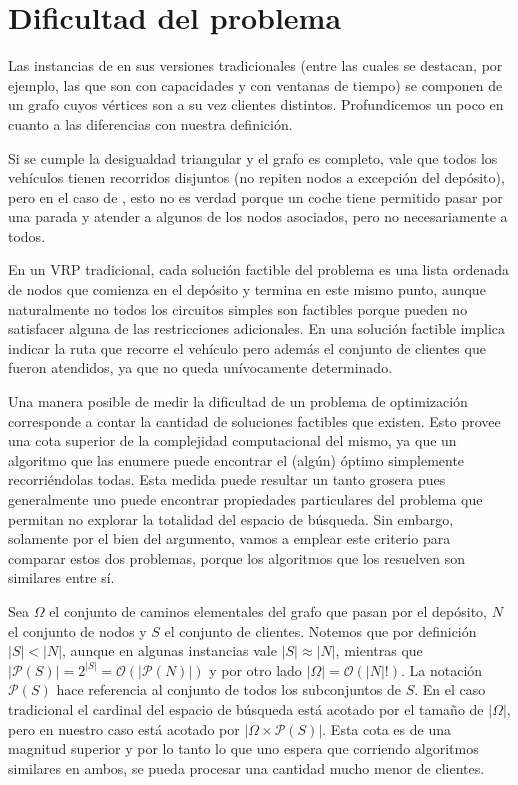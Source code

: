 \section{Dificultad del problema}
\label{section:complexity}

Las instancias de  en sus versiones tradicionales (entre las cuales se destacan, por ejemplo, las que son con capacidades y con ventanas de tiempo) se componen de un grafo cuyos vértices son a su vez clientes distintos. Profundicemos un poco en cuanto a las diferencias con nuestra definición.

Si se cumple la desigualdad triangular y el grafo es completo, vale que todos los vehículos tienen recorridos disjuntos (no repiten nodos a excepción del depósito), pero en el caso de , esto no es verdad porque un coche tiene permitido pasar por una parada y atender a algunos de los nodos asociados, pero no necesariamente a todos. 

En un VRP tradicional, cada solución factible del problema es una lista ordenada de nodos que comienza en el depósito y termina en este mismo punto, aunque naturalmente no todos los circuitos simples son factibles porque pueden no satisfacer alguna de las restricciones adicionales. En  una solución factible implica indicar la ruta que recorre el vehículo pero además el conjunto de clientes que fueron atendidos, ya que no queda unívocamente determinado. 

Una manera posible de medir la dificultad de un problema de optimización corresponde a contar la cantidad de soluciones factibles que existen. Esto provee una cota superior de la complejidad computacional del mismo, ya que un algoritmo que las enumere puede encontrar el (algún) óptimo simplemente recorriéndolas todas. Esta medida puede resultar un tanto grosera pues generalmente uno puede encontrar propiedades particulares del problema que permitan no explorar la totalidad del espacio de búsqueda. Sin embargo, solamente por el bien del argumento, vamos a emplear este criterio para comparar estos dos problemas, porque los algoritmos que los resuelven son similares entre sí.

Sea $\Omega$ el conjunto de caminos elementales del grafo que pasan por el depósito, $N$ el conjunto de nodos y $S$ el conjunto de clientes. Notemos que por definición $|S| < |N|$, aunque en algunas instancias vale $|S| \approx |N|$, mientras que $|\mathscr{P}(S)| = 2^{|S|} = \mathcal{O}(|\mathscr{P}(N)|)$ y por otro lado $|\Omega| = \mathcal{O}(|N|!)$. La notación $\mathscr{P}(S)$ hace referencia al conjunto de todos los subconjuntos de $S$. En el caso tradicional el cardinal del espacio de búsqueda está acotado por el tamaño de $|\Omega|$, pero en nuestro caso está acotado por $|\Omega \times \mathscr{P}(S)|$. Esta cota es de una magnitud superior y por lo tanto lo que uno espera que corriendo algoritmos similares en ambos, se pueda procesar una cantidad mucho menor de clientes.  


